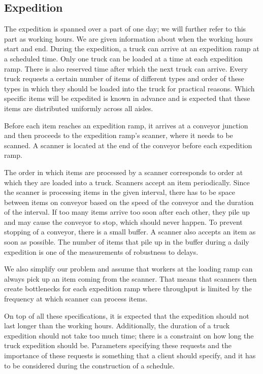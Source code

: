 \documentclass{ctuthesis}
\begin{document}
\subsection{Expedition}
\label{subsec:expedition}
The expedition is spanned over a part of one day; we will further refer to this part as working hours. We are given information about when the working hours start and end. During the expedition, a truck can arrive at an expedition ramp at a scheduled time. Only one truck can be loaded at a time at each expedition ramp. There is also reserved time after which the next truck can arrive. Every truck requests a certain number of items of different types and order of these types in which they should be loaded into the truck for practical reasons. Which specific items will be expedited is known in advance and is expected that these items are distributed uniformly across all aisles. 

Before each item reaches an expedition ramp, it arrives at a conveyor junction and then proceeds to the expedition ramp's scanner, where it needs to be scanned. A scanner is located at the end of the conveyor before each expedition ramp. 

The order in which items are processed by a scanner corresponds to order at which they are loaded into a truck. Scanners accept an item periodically. Since the scanner is processing items in the given interval, there has to be space between items on conveyor based on the speed of the conveyor and the duration of the interval. If too many items arrive too soon after each other, they pile up and may cause the conveyor to stop, which should never happen. To prevent stopping of a conveyor, there is a small buffer. A scanner also accepts an item as soon as possible. The number of items that pile up in the buffer during a daily expedition is one of the measurements of robustness to delays.

We also simplify our problem and assume that workers at the loading ramp can always pick up an item coming from the scanner. That means that scanners then create bottlenecks for each expedition ramp where throughput is limited by the frequency at which scanner can process items.

On top of all these specifications, it is expected that the expedition should not last longer than the working hours. Additionally, the duration of a truck expedition should not take too much time; there is a constraint on how long the truck expedition should be. Parameters specifying these requests and the importance of these requests is something that a client should specify, and it has to be considered during the construction of a schedule.
\end{document}

